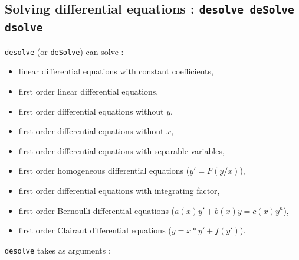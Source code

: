 \documentclass[a4paper,11pt]{book}
\begin{document}
\subsection{Solving differential equations : {\tt desolve deSolve \\
dsolve}}
{\tt desolve} (or {\tt deSolve}) can solve :
\begin{itemize}
\item linear differential equations with constant coefficients,
\item first order linear differential equations,
\item first order differential equations without $y$,
\item first order differential equations without $x$,
\item first order differential equations with separable variables,
\item first order homogeneous differential equations ($y'=F(y/x)$),
\item first order differential equations with integrating factor,
\item first order Bernoulli differential equations ($a(x)y'+b(x)y=c(x)y^n$),
\item first order Clairaut differential equations ($y=x*y'+f(y')$).
\end{itemize}
{\tt desolve} takes as arguments : 
\end{document}
